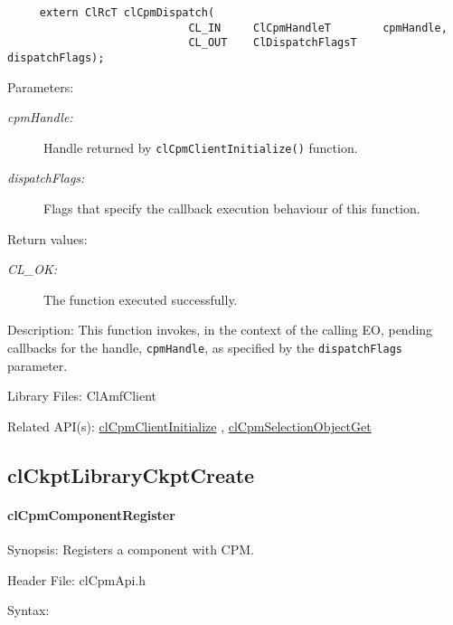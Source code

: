 {\begin{Desc}
\footnotesize\begin{verbatim}     extern ClRcT clCpmDispatch(
                			CL_IN     ClCpmHandleT        cpmHandle,
                			CL_OUT    ClDispatchFlagsT    dispatchFlags);
\end{verbatim}
\normalsize
\end{Desc}
\begin{Desc}
\item[Parameters:]
\begin{description}
\item[{\em cpm\-Handle:}]Handle returned by {\tt{cl\-Cpm\-Client\-Initialize()}} function. 
\item[{\em dispatch\-Flags:}]Flags that specify the callback execution behaviour of this function.
\end{description}
\end{Desc}
\begin{Desc}
\item[Return values:]
\begin{description}
\item[{\em CL\_\-OK:}]The function executed successfully.\end{description}
\end{Desc}
\begin{Desc}
\item[Description:]This function invokes, in the context of the calling EO, pending callbacks for the handle, {\tt{cpm\-Handle}}, as specified by the 
{\tt{dispatch\-Flags}} parameter.\end{Desc}
\begin{Desc}
\item[Library Files:]Cl\-Amf\-Client\end{Desc}

\begin{Desc}
\item[Related API(s):]\hyperlink{group__group14}{cl\-Cpm\-Client\-Initialize} , \hyperlink{group__group14}{cl\-Cpm\-Selection\-Object\-Get} \end{Desc}

\newpage





\subsection{clCkptLibraryCkptCreate}
\hypertarget{pagecpm112}{}\paragraph{cl\-Cpm\-Component\-Register}\label{pagecpm112}
\begin{Desc}
\item[Synopsis:]Registers a component with CPM.\end{Desc}
\begin{Desc}
\item[Header File:]clCpmApi.h\end{Desc}
\begin{Desc}
\item[Syntax:]


\end{Desc}}
